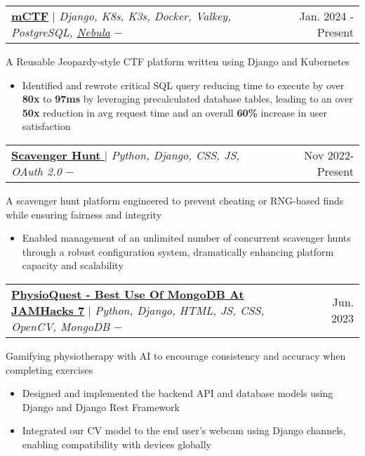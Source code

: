 \documentclass[11pt,letterpaper]{article}
\makeatletter
\newcommand{\resumeItem}[1]{
    \item\small{
            {#1 \vspace{-2pt}}
    }
}
\newcommand{\resumeProjectHeadingWithDescription}[4]{
    \item
    \begin{tabular*}{0.97\textwidth}{l@{\extracolsep{\fill}}r}
        \small#2 $-$ \githubUrl{#1} & #3 \\
    \end{tabular*}
    \vspace{-7pt}
    \small{#4}
}
\newcommand{\resumeItemListStart}{\begin{itemize}}
\newcommand{\resumeItemListEnd}{\end{itemize}\vspace{-5pt}}
\newcommand{\githubUrl}[1]{%
   \href{#1}{\faGithub}%
}
\makeatother
\begin{document}
\resumeProjectHeadingWithDescription
{https://github.com/mcpt/ctf}
{\underline{\textbf{\href{https://ctf.mcpt.ca}{mCTF}}} $|$ \emph{Django, K8s, K3s, Docker, Valkey, PostgreSQL, \href{https://github.com/slackhq/nebula}{\underline{Nebula}}}}{Jan. 2024 - Present}
{A Reusable Jeopardy-style CTF platform written using Django and Kubernetes}
\resumeItemListStart
\resumeItem{Identified and rewrote critical SQL query reducing time to execute by over \textbf{80x} to \textbf{97ms} by leveraging precalculated database tables, leading to an over \textbf{50x} reduction in avg request time and an overall \textbf{60\%} increase in user satisfaction}
\resumeItemListEnd

\resumeProjectHeadingWithDescription
{https://github.com/wlmac/scavenger}
{\underline{\href{https://github.com/wlmac/scavenger}{\textbf{Scavenger Hunt }}} $|$  \emph{Python, Django, CSS, JS, OAuth 2.0}}{Nov 2022-Present}{A scavenger hunt platform engineered to prevent cheating or RNG-based finds while ensuring fairness and integrity}
\resumeItemListStart
\resumeItem{Enabled management of an unlimited number of concurrent scavenger hunts through a robust configuration system, dramatically enhancing platform capacity and scalability
}
\resumeItemListEnd



\resumeProjectHeadingWithDescription
{https://github.com/JasonLovesDoggo/jamhacks}
{\underline{\textbf{\href{https://devpost.com/software/physioquest}{PhysioQuest - Best Use Of MongoDB At} \href{https://www.jamhacks.ca/}{JAMHacks 7}}} $|$ \emph{Python, Django, HTML, JS, CSS, OpenCV, MongoDB}}{Jun. 2023}
{Gamifying physiotherapy with AI to encourage consistency and accuracy when completing exercises}
\resumeItemListStart
\resumeItem{Designed and implemented the backend API and database models using Django and Django Rest Framework}
\resumeItem{Integrated our CV model to the end user’s webcam using Django channels, enabling compatibility with devices globally}
\resumeItemListEnd
\end{document}

